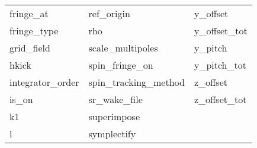 \begin{tabular}{lll}
fringe_at                   & ref_origin                  & y_offset                    \\
fringe_type                 & rho                         & y_offset_tot                \\
grid_field                  & scale_multipoles            & y_pitch                     \\
hkick                       & spin_fringe_on              & y_pitch_tot                 \\
integrator_order            & spin_tracking_method        & z_offset                    \\
is_on                       & sr_wake_file                & z_offset_tot                \\
k1                          & superimpose                 &                             \\
l                           & symplectify                 &                             \\
 \bottomrule
 \end{tabular}
 \vfill
 
